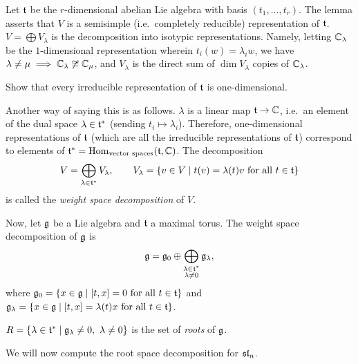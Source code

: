 Let $\at$ be the $r$-dimensional abelian Lie algebra with basis
$(t_1, \dots, t_r)$. The lemma asserts that $V$ is a semisimple (i.e.\
completely reducible) representation of $\at$. $V = \bigoplus V_\lambda$ is the
decomposition into isotypic representations. Namely, letting $\C_\lambda$ be
the $1$-dimensional representation wherein $t_i(w) = \lambda_iw$, we have
$\lambda \neq \mu \implies \C_\lambda \not\cong \C_\mu$, and $V_\lambda$ is
the direct sum of $\dim V_\lambda$ copies of $\C_\lambda$.

\begin{exercise}
Show that every irreducible representation of $\at$ is one-dimensional.
\end{exercise}

Another way of saying this is as follows. $\lambda$ is a linear map
$\at \to \C$, i.e.\ an element of the dual space $\lambda \in \at^*$ (sending
$t_i \mapsto \lambda_i$). Therefore, one-dimensional representations of $\at$
(which are all the irreducible representations of $\at$) correspond to
elements of $\at^* = \Hom_{\text{vector spaces}}(\at, \C)$. The decomposition
\[
  V = \bigoplus_{\lambda \in \at^*} V_\lambda, \qquad
  V_\lambda = \setc{v \in V}{t(v) = \lambda(t)v \text{ for all } t \in \at}
\]
is called the \emph{weight space decomposition} of $V$.

Now, let $\g$ be a Lie algebra and $\at$ a maximal torus. The weight space
decomposition of $\g$ is
\[
  \g = \g_0 \oplus \bigoplus_{\substack{\lambda \in \at^*\\ \lambda \neq 0}} \g_\lambda,
\]
where $\g_0 = \setc{x \in \g}{[t, x] = 0 \text{ for all } t \in \at}$ and
$\g_\lambda = \setc{x \in \g}{[t, x] = \lambda(t)x \text{ for all } t \in \at}$.

\begin{definition}
$R = \setc{\lambda \in \at^*}{\g_\lambda \neq 0,\ \lambda \neq 0}$ is the set
of \emph{roots} of $\g$.
\end{definition}

We will now compute the root space decomposition for $\sl_n$.

